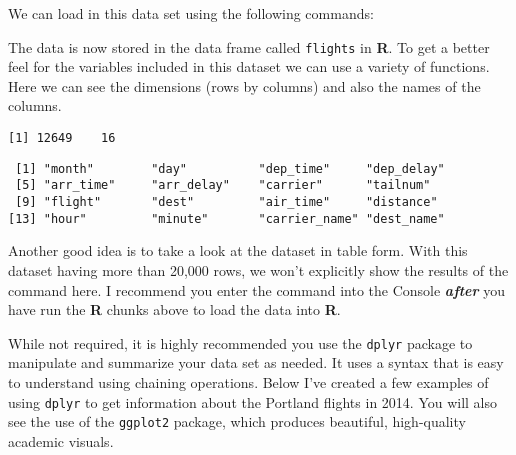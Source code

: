 We can load in this data set using the following commands:
\begin{Shaded}
\begin{Highlighting}[]
\OtherTok{\textless{}{-}}\SpecialCharTok{::}\NormalTok{(}\NormalTok{, }\NormalTok{)}
\OtherTok{\textless{}{-}}  \NormalTok{)}
\end{Highlighting}
\end{Shaded}
The data is now stored in the data frame called \texttt{flights} in \textbf{R}. To get a better feel for the variables included in this dataset we can use a variety of functions. Here we can see the dimensions (rows by columns) and also the names of the columns.
\begin{Shaded}
\begin{Highlighting}[]
\end{Highlighting}
\end{Shaded}
\begin{verbatim}
[1] 12649    16
\end{verbatim}
\begin{Shaded}
\begin{Highlighting}[]
\end{Highlighting}
\end{Shaded}
\begin{verbatim}
 [1] "month"        "day"          "dep_time"     "dep_delay"   
 [5] "arr_time"     "arr_delay"    "carrier"      "tailnum"     
 [9] "flight"       "dest"         "air_time"     "distance"    
[13] "hour"         "minute"       "carrier_name" "dest_name"   
\end{verbatim}
Another good idea is to take a look at the dataset in table form. With this dataset having more than 20,000 rows, we won't explicitly show the results of the command here. I recommend you enter the command into the Console \textbf{\emph{after}} you have run the \textbf{R} chunks above to load the data into \textbf{R}.
\begin{Shaded}
\begin{Highlighting}[]
\end{Highlighting}
\end{Shaded}
While not required, it is highly recommended you use the \texttt{dplyr} package to manipulate and summarize your data set as needed. It uses a syntax that is easy to understand using chaining operations. Below I've created a few examples of using \texttt{dplyr} to get information about the Portland flights in 2014. You will also see the use of the \texttt{ggplot2} package, which produces beautiful, high-quality academic visuals.

